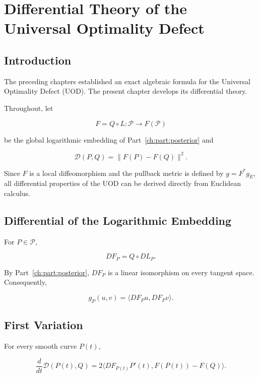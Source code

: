 \chapter[Differential Theory of the UOD]{Differential Theory of the Universal Optimality Defect}\label{ch:sec:differential-theory-of-the-universal-optimality-defect}

\section{Introduction}\label{ch:sec:introduction-analytic_uod-3}

The preceding chapters established an exact algebraic formula for the Universal
Optimality Defect (UOD). The present chapter develops its differential
theory.

Throughout, let

\[
F=Q\circ L:\mathcal P\rightarrow F(\mathcal P)
\]

be the global logarithmic embedding of Part~\ref{ch:part:posterior} and

\[
\mathcal D(P,Q)=\|F(P)-F(Q)\|^{2}.
\]

Since \(F\) is a local diffeomorphism and the pullback metric is defined
by \(g=F^{*}g_E\), all differential properties of the UOD can be derived
directly from Euclidean calculus.

\section{Differential of the Logarithmic Embedding}\label{ch:sec:differential-of-the-logarithmic-embedding}

For \(P\in\mathcal P\),

\[
DF_P=Q\circ DL_P.
\]

By Part~\ref{ch:part:posterior}, \(DF_P\) is a linear isomorphism on every tangent space.
Consequently,

\[
g_P(u,v)=\langle DF_Pu,DF_Pv\rangle.
\]

\section{First Variation}\label{ch:sec:first-variation}

\begin{theorem}
\label{ch:thm:22-1}
For every smooth curve \(P(t)\),

\[
\frac{d}{dt}\mathcal D(P(t),Q)=
2\langle DF_{P(t)}P'(t),F(P(t))-F(Q)\rangle.
\]
\end{theorem}

